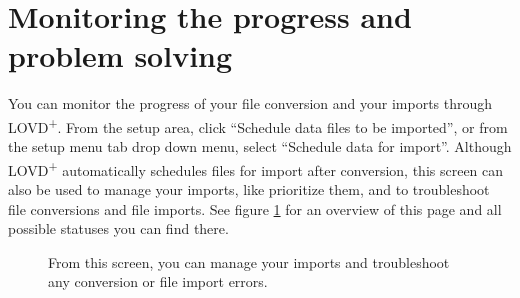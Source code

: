\section{Monitoring the progress and problem solving}
\label{sec:import_monitoring}
You can monitor the progress of your file conversion and your imports through LOVD\textsuperscript{+}.
From the setup area, click ``Schedule data files to be imported'',
 or from the setup menu tab drop down menu, select ``Schedule data for import''.
Although LOVD\textsuperscript{+} automatically schedules files for import after conversion, this screen can also be
 used to manage your imports, like prioritize them, and to troubleshoot file conversions and file imports.
See figure \ref{fig:c03s05_screenshot_import_scheduler_plus}
 for an overview of this page and all possible statuses you can find there.

\begin{figure}[ht]
  \begin{shaded}
    \caption{From this screen, you can manage your imports and troubleshoot any conversion or file import errors.}
    \label{fig:c03s05_screenshot_import_scheduler_plus}
  \end{shaded}
\end{figure}

